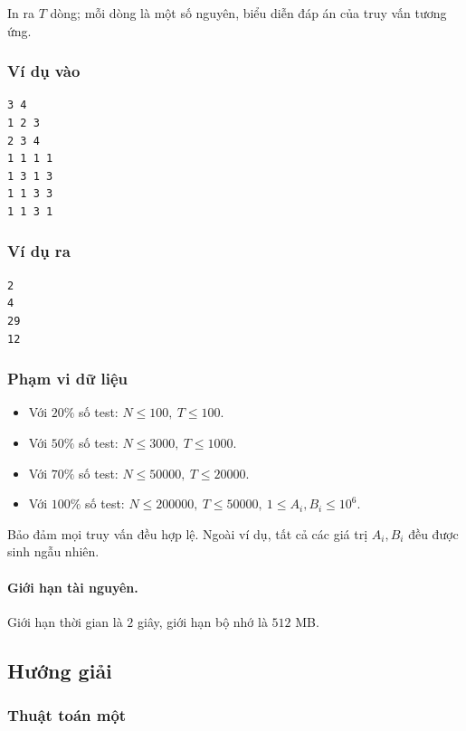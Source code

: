 \documentclass[11pt]{article}
\begin{document}
In ra \(T\) dòng; mỗi dòng là một số nguyên, biểu diễn đáp án của truy vấn
tương ứng.

\subsubsection{Ví dụ vào}

\begin{verbatim}
3 4
1 2 3
2 3 4
1 1 1 1
1 3 1 3
1 1 3 3
1 1 3 1
\end{verbatim}

\subsubsection{Ví dụ ra}

\begin{verbatim}
2
4
29
12
\end{verbatim}

\subsubsection{Phạm vi dữ liệu}

\begin{itemize}
  \item Với \(20\%\) số test: \(N\le 100,\ T\le 100\).
  \item Với \(50\%\) số test: \(N\le 3000,\ T\le 1000\).
  \item Với \(70\%\) số test: \(N\le 50000,\ T\le 20000\).
  \item Với \(100\%\) số test:
  \(N\le 200000,\ T\le 50000,\ 1\le A_i,B_i\le 10^6\).
\end{itemize}

Bảo đảm mọi truy vấn đều hợp lệ. Ngoài ví dụ, tất cả các giá trị \(A_i,B_i\)
đều được sinh ngẫu nhiên.

\paragraph{Giới hạn tài nguyên.}
Giới hạn thời gian là \(2\) giây, giới hạn bộ nhớ là \(512\) MB.

\subsection{Hướng giải}

\subsubsection{Thuật toán một}
\end{document}
